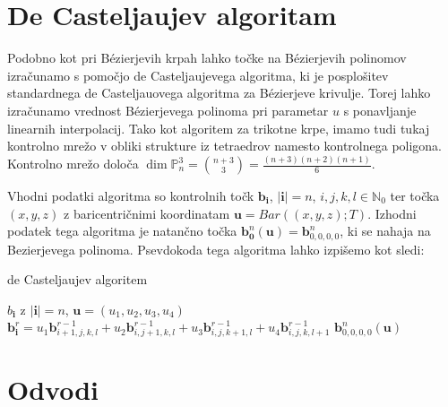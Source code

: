 \documentclass[a4paper, 12pt]{article}
\theoremstyle{definition} %
\theoremstyle{plain} %
\begin{document}
\section{De Casteljaujev algoritam}
Podobno kot pri Bézierjevih krpah lahko točke na Bézierjevih polinomov izračunamo s pomočjo de Casteljaujevega algoritma, ki je posplošitev standardnega de Casteljauovega algoritma za Bézierjeve krivulje. 
Torej lahko izračunamo vrednost Bézierjevega polinoma pri parametar $u$ s ponavljanje linearnih interpolacij. 
Tako kot algoritem za trikotne krpe, imamo tudi tukaj kontrolno mrežo v obliki strukture iz tetraedrov namesto kontrolnega poligona. Kontrolno mrežo določa $\dim\mathbb{P}^{3}_{n} = \binom{n+3}{3} = \frac{(n+3)(n+2)(n+1)}{6}$.

Vhodni podatki algoritma so kontrolnih točk $\textbf{b}_{\textbf{i}}$, $|\textbf{i}| = n$, $i, j, k, l \in \mathbb{N}_{0}$ 
ter točka $(x, y, z)$ z baricentričnimi koordinatam $\textbf{u} = Bar((x,y,z); T)$. 
Izhodni podatek tega algoritma je natančno točka $\textbf{b}_{\textbf{0}}^{n}(\textbf{u}) = \textbf{b}_{0,0,0,0}^{n}$, ki se nahaja na Bezierjevega polinoma. 
Psevdokoda tega algoritma lahko izpišemo kot sledi:

\begin{algorithm}
\caption{de Casteljaujev algoritem}\label{alg:cas}
\begin{algorithmic}
\Require \textbf{$b_{\textbf{i}}$} z $|\textbf{i}| = n$, $\textbf{u} = (u_{1}, u_{2}, u_{3}, u_{4})$
		\State $\textbf{b}^{r}_{\textbf{i}} = u_{1}\textbf{b}^{r-1}_{i+1,j,k,l} + u_{2}\textbf{b}^{r-1}_{i,j+1,k,l} + u_{3}\textbf{b}^{r-1}_{i,j,k+1,l} + u_{4}\textbf{b}^{r-1}_{i,j,k,l+1}$
	\EndFor
\EndFor
\Ensure $\textbf{b}_{0,0,0,0}^{n}(\textbf{u})$
\end{algorithmic}
\end{algorithm}


\section{Odvodi}
\end{document}
